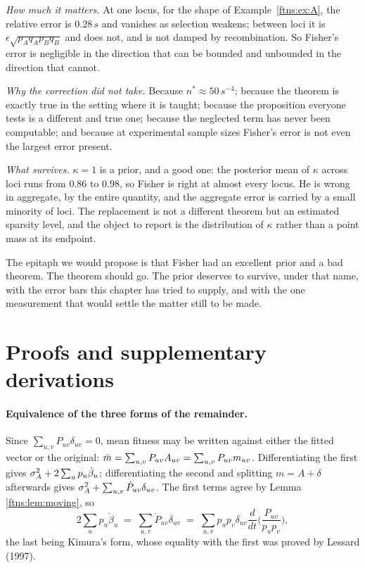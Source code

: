 \emph{How much it matters.} At one locus, for the shape of Example~\ref{ftns:ex:A}, the relative error is $0.28\,s$ and vanishes as selection
weakens; between loci it is $\epsilon\sqrt{p_Aq_Ap_Bq_B}$ and does not, and is not damped by
recombination. So Fisher's error is negligible in the direction that can be bounded and unbounded
in the direction that cannot.

\emph{Why the correction did not take.} Because $n^\ast\approx50\,s^{-4}$; because the theorem is
exactly true in the setting where it is taught; because the proposition everyone tests is a
different and true one; because the neglected term has never been computable; and because at
experimental sample sizes Fisher's error is not even the largest error present.

\emph{What survives.} $\kappa=1$ is a prior, and a good one: the posterior mean of $\kappa$ across
loci runs from $0.86$ to $0.98$, so Fisher is right at almost every locus. He is wrong in
aggregate, by the entire quantity, and the aggregate error is carried by a small minority of loci.
The replacement is not a different theorem but an estimated sparsity level, and the object to
report is the distribution of $\kappa$ rather than a point mass at its endpoint.

The epitaph we would propose is that Fisher had an excellent prior and a bad theorem. The theorem
should go. The prior deserves to survive, under that name, with the error bars this chapter has tried
to supply, and with the one measurement that would settle the matter still to be made.



\section{Proofs and supplementary derivations}
\label{ftns:app:proofs}

\paragraph{Equivalence of the three forms of the remainder.} Since $\sum_{u,v}P_{uv}\delta_{uv}=0$, mean fitness may be written against either the fitted vector
or the original: $\bar{m}=\sum_{u,v}P_{uv}A_{uv}=\sum_{u,v}P_{uv}m_{uv}$. Differentiating the first
gives $\sigma^{2}_{A}+2\sum_up_u\dot\beta_u$; differentiating the second and splitting $m=A+\delta$ afterwards
gives $\sigma^{2}_{A}+\sum_{u,v}\dot P_{uv}\delta_{uv}$. The first terms agree by Lemma \ref{ftns:lem:moving}, so
\[
2\sum_u p_u\dot\beta_u \;=\; \sum_{u,v}\dot P_{uv}\delta_{uv}
\;=\; \sum_{u,v}p_up_v\delta_{uv}\frac{d}{dt}\Big(\frac{P_{uv}}{p_up_v}\Big),
\]
the last being Kimura's form, whose equality with the first was proved by Lessard (1997).

